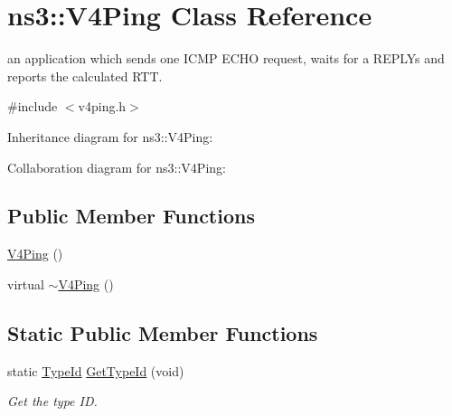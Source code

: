 \hypertarget{classns3_1_1V4Ping}{}\section{ns3\+:\+:V4\+Ping Class Reference}
\label{classns3_1_1V4Ping}


an application which sends one I\+C\+MP E\+C\+HO request, waits for a R\+E\+P\+L\+Ys and reports the calculated R\+TT.  




{\ttfamily \#include $<$v4ping.\+h$>$}



Inheritance diagram for ns3\+:\+:V4\+Ping\+:


Collaboration diagram for ns3\+:\+:V4\+Ping\+:
\subsection*{Public Member Functions}
\begin{DoxyCompactItemize}
\item 
\hyperlink{classns3_1_1V4Ping_a9ab6470343fdf71770bcd6240858434d}{V4\+Ping} ()
\item 
virtual \hyperlink{classns3_1_1V4Ping_a30faf1270640d25f007bb74cb12813b6}{$\sim$\+V4\+Ping} ()
\end{DoxyCompactItemize}
\subsection*{Static Public Member Functions}
\begin{DoxyCompactItemize}
\item 
static \hyperlink{classns3_1_1TypeId}{Type\+Id} \hyperlink{classns3_1_1V4Ping_af207b6dc0ed793798083c34a1c388770}{Get\+Type\+Id} (void)
\begin{DoxyCompactList}\small\item\em Get the type ID. \end{DoxyCompactList}\end{DoxyCompactItemize}
